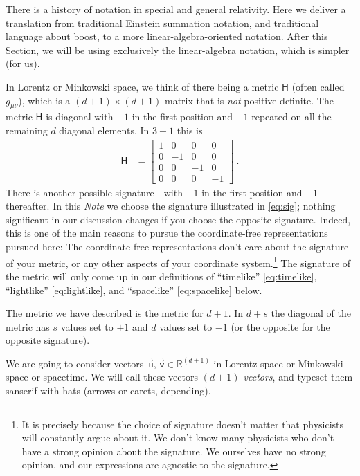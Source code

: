 \documentclass{article}
\newcommand{\metric}{\mathsf{H}}
\newcommand\upvec[1]{\!\vec{\,\mathrm{#1}}}
\newcommand{\Lvec}[1]{\upvec{\mathsf{#1}}} %
\newcommand{\plus}{\!+\!} %
\newcommand{\documentname}{\textsl{Note}}
\begin{document}
There is a history of notation in special and general relativity.
Here we deliver a translation from traditional Einstein summation notation, and traditional language about boost, to a more linear-algebra-oriented notation.
After this Section, we will be using exclusively the linear-algebra notation, which is simpler (for us).

In Lorentz or Minkowski space, we think of there being a metric $\metric$ (often called $g_{\mu\nu}$), which is a $(d\plus1)\times(d\plus1)$ matrix that is \emph{not} positive definite.
The metric $\metric$ is diagonal with $+1$ in the first position and $-1$ repeated on all the remaining $d$ diagonal elements.
In $3\plus1$ this is
\begin{align}\label{eq:sig}
    \metric &= \begin{bmatrix}1 & 0 & 0 & 0\\
                              0 & -1 & 0 & 0\\
                              0 & 0 & -1 & 0\\
                              0 & 0 & 0 & -1\end{bmatrix} ~.
\end{align}
There is another possible signature---with $-1$ in the first position and $+1$ thereafter.
In this \documentname{} we choose the signature illustrated in \eqref{eq:sig}; nothing significant in our discussion changes if you choose the opposite signature.
Indeed, this is one of the main reasons to pursue the coordinate-free representations pursued here:
The coordinate-free representations don't care about the signature of your metric, or any other aspects of your coordinate system.\footnote{It is precisely because the choice of signature doesn't matter that physicists will constantly argue about it. We don't know many physicists who don't have a strong opinion about the signature. We ourselves have no strong opinion, and our expressions are agnostic to the signature.}
The signature of the metric will only come up in our definitions of ``timelike'' \eqref{eq:timelike}, ``lightlike'' \eqref{eq:lightlike}, and ``spacelike'' \eqref{eq:spacelike} below.

The metric we have described is the metric for $d\plus 1$.
In $d\plus s$ the diagonal of the metric has $s$ values set to $+1$ and $d$ values set to $-1$ (or the opposite for the opposite signature).

We are going to consider vectors $\Lvec{u}, \Lvec{v}\in\mathbb{R}^{(d+1)}$ in Lorentz space or Minkowski space or spacetime.
We will call these vectors \emph{$(d\plus1)$-vectors}, and typeset them sanserif with hats (arrows or carets, depending).
\end{document}
